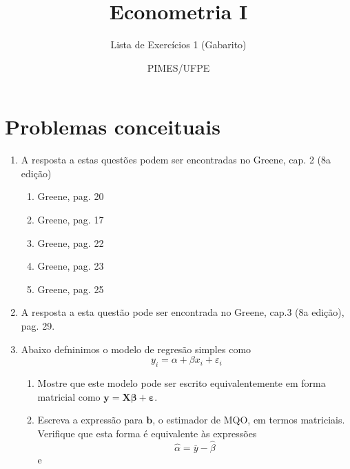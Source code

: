 \documentclass[
  11pt,
]{article}
\title{Econometria I}
\author{Lista de Exercícios 1 (Gabarito)}
\date{PIMES/UFPE}
\begin{document}
\maketitle

\vspace{0.25in}

\hypertarget{problemas-conceituais}{%
\section{Problemas conceituais}\label{problemas-conceituais}}

\begin{enumerate}
\def\labelenumi{\arabic{enumi}.}
\item
  A resposta a estas questões podem ser encontradas no Greene, cap. 2
  (8a edição)

  \begin{enumerate}
  \def\labelenumii{\alph{enumii}.}
  \item
    Greene, pag. 20
  \item
    Greene, pag. 17
  \item
    Greene, pag. 22
  \item
    Greene, pag. 23
  \item
    Greene, pag. 25
  \end{enumerate}
\item
  A resposta a esta questão pode ser encontrada no Greene, cap.3 (8a
  edição), pag. 29.
\item
  Abaixo defninimos o modelo de regresão simples como
  \[y_i=\alpha + \beta x_i + \varepsilon_i\]

  \begin{enumerate}
  \def\labelenumii{\alph{enumii}.}
  \item
    Mostre que este modelo pode ser escrito equivalentemente em forma
    matricial como
    \(\mathbf{y}=\mathbf{X}\mathbf{\beta}+\mathbf{\varepsilon}\).
  \item
    Escreva a expressão para \(\mathbf{b}\), o estimador de MQO, em
    termos matriciais. Verifique que esta forma é equivalente às
    expressões \[\hat{\alpha}=\bar{y}-\hat{\beta}\] e
  \end{enumerate}


\end{enumerate}
\end{document}

